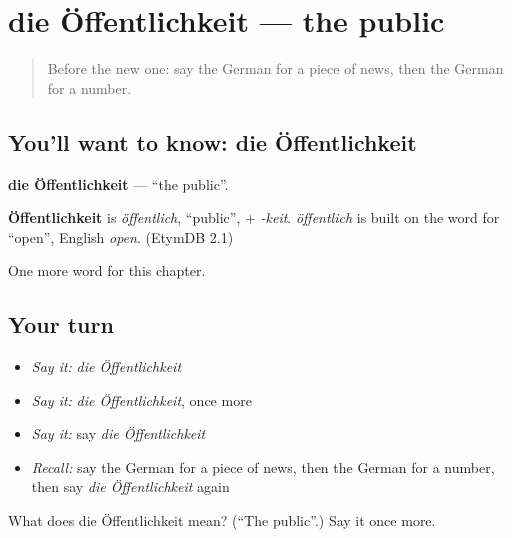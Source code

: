 \section[die Öffentlichkeit]{die Öffentlichkeit — the public}

\label{lesson:GE-C235-oeffentlichkeit}



\begin{quote}
Before the new one: say the German for a piece of news, then the German for a number.
\end{quote}

\subsection*{You'll want to know: die Öffentlichkeit}
\textbf{die Öffentlichkeit} — \textquotedblleft{}the public\textquotedblright{}.

\begin{cousinweb}
\textbf{Öffentlichkeit} is \emph{öffentlich}, \textquotedblleft{}public\textquotedblright{}, + \emph{-keit}. \emph{öffentlich} is built on the word for \textquotedblleft{}open\textquotedblright{}, English \emph{open}. (EtymDB 2.1)
\end{cousinweb}

\begin{grammarlens}[title={What you've built}]
One more word for this chapter.
\end{grammarlens}

\subsection*{Your turn}
\begin{itemize}
\raggedright
  \item \emph{Say it:} \emph{die Öffentlichkeit}
  \item \emph{Say it:} \emph{die Öffentlichkeit}, once more
  \item \emph{Say it:} say \emph{die Öffentlichkeit}
  \item \emph{Recall:} say the German for a piece of news, then the German for a number, then say \emph{die Öffentlichkeit} again
\end{itemize}

\begin{tcolorbox}[breakable,colback=teal!4,colframe=teal!35!black,title={Before you move on}]
What does die Öffentlichkeit mean? (\textquotedblleft{}The public\textquotedblright{}.) Say it once more.
\end{tcolorbox}
